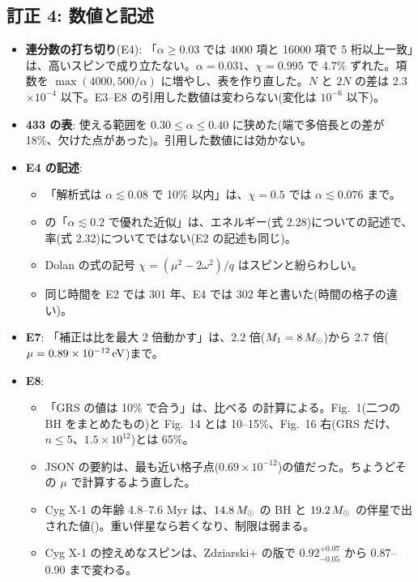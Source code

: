 \subsection{訂正 4: 数値と記述}

\begin{itemize}
\item \textbf{連分数の打ち切り}(E4): 「$\alpha\ge0.03$ では 4000 項と 16000 項で 5 桁以上一致」は、高いスピンで成り立たない。$\alpha=0.031$、$\chi=0.995$ で 4.7\% ずれた。項数を $\max(4000,500/\alpha)$ に増やし、表を作り直した。$N$ と $2N$ の差は 2.3$\times10^{-4}$ 以下。E3--E8 の引用した数値は変わらない(変化は $10^{-6}$ 以下)。
\item \textbf{433 の表}: 使える範囲を $0.30\le\alpha\le0.40$ に狭めた(端で多倍長との差が 18\%、欠けた点があった)。引用した数値には効かない。
\item \textbf{E4 の記述}:
  \begin{itemize}
  \item 「解析式は $\alpha\lesssim0.08$ で 10\% 以内」は、$\chi=0.5$ では $\alpha\lesssim0.076$ まで。
  \item {} の「$\alpha\lesssim0.2$ で優れた近似」は、エネルギー(式 2.28)についての記述で、率(式 2.32)についてではない(E2 の記述も同じ)。
  \item Dolan の式の記号 $\chi=(\mu^2-2\omega^2)/q$ はスピンと紛らわしい。
  \item 同じ時間を E2 では 301 年、E4 では 302 年と書いた(時間の格子の違い)。
  \end{itemize}
\item \textbf{E7}: 「補正は比を最大 2 倍動かす」は、2.2 倍($M_1=8\,M_\odot$)から 2.7 倍($\mu=0.89\times10^{-12}\,\mathrm{eV}$)まで。
\item \textbf{E8}:
  \begin{itemize}
  \item 「GRS の値は 10\% で合う」は、比べる  の計算による。Fig.~1(二つの BH をまとめたもの)と Fig.~14 とは 10--15\%、Fig.~16 右(GRS だけ、$n\le5$、$1.5\times10^{12}$)とは 65\%。
  \item JSON の要約は、最も近い格子点($0.69\times10^{-12}$)の値だった。ちょうどその $\mu$ で計算するよう直した。
  \item Cyg X-1 の年齢 4.8--7.6 Myr は、$14.8\,M_\odot$ の BH と $19.2\,M_\odot$ の伴星で出された値()。重い伴星なら若くなり、制限は弱まる。
  \item Cyg X-1 の控えめなスピンは、Zdziarski+  の版で $0.92^{+0.07}_{-0.05}$ から $0.87$--$0.90$ まで変わる。

\end{itemize}
\end{itemize}
